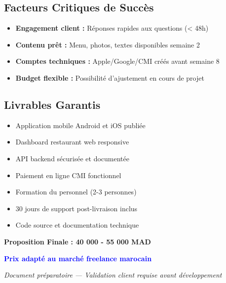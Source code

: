 \documentclass[11pt,a4paper]{article}
\begin{document}
\subsection{Facteurs Critiques de Succès}

\begin{itemize}
    \item \textbf{Engagement client :} Réponses rapides aux questions (< 48h)
    \item \textbf{Contenu prêt :} Menu, photos, textes disponibles semaine 2
    \item \textbf{Comptes techniques :} Apple/Google/CMI créés avant semaine 8
    \item \textbf{Budget flexible :} Possibilité d'ajustement en cours de projet
\end{itemize}

\subsection{Livrables Garantis}

\begin{itemize}
    \item Application mobile Android et iOS publiée
    \item Dashboard restaurant web responsive
    \item API backend sécurisée et documentée
    \item Paiement en ligne CMI fonctionnel
    \item Formation du personnel (2-3 personnes)
    \item 30 jours de support post-livraison inclus
    \item Code source et documentation technique
\end{itemize}

\vfill

\begin{center}
\textbf{Proposition Finale : 40 000 - 55 000 MAD}

\textcolor{blue}{\textbf{Prix adapté au marché freelance marocain}}

\textit{Document préparatoire — Validation client requise avant développement}
\end{center}
\end{document}
